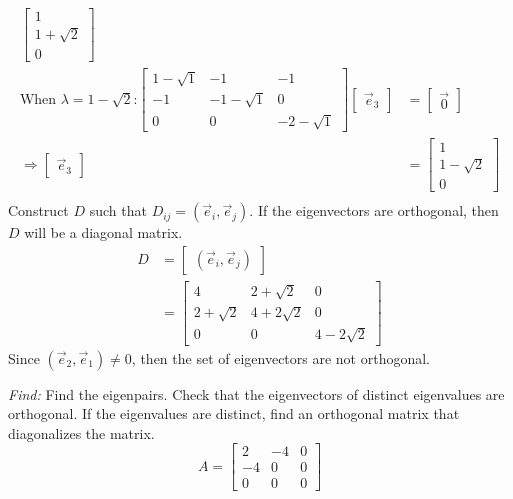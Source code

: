 \documentclass[11pt]{homework}
\begin{document}
\begin{align*}
\begin{bmatrix}
    1 \\
    1 + \sqrt{2} \\
    0
  \end{bmatrix}  \\
\text{When $\lambda = 1 - \sqrt{2}$:}
  \begin{bmatrix}
  1- \sqrt{1}  & -1 & -1 \\
  -1 & -1 - \sqrt{1} & 0 \\
  0 & 0 & -2 - \sqrt{1}
  \end{bmatrix}
  \begin{bmatrix}
    \vec e_3
  \end{bmatrix}
  &= 
  \begin{bmatrix}
    \vec 0
  \end{bmatrix} \\
  \Rightarrow
  \begin{bmatrix}
    \vec e_3
  \end{bmatrix}
  &= 
  \begin{bmatrix}
    1 \\
    1 - \sqrt{2} \\
    0
  \end{bmatrix}  \\
\end{align*}
Construct $D$ such that $D_{ij} = (\vec e_i, \vec e_j)$. 
If the eigenvectors are orthogonal, 
then $D$ will be a diagonal matrix.
\begin{align*}
D &= 
  \begin{bmatrix}
  (\vec e_i, \vec e_j)
  \end{bmatrix} \\
  &=
  \begin{bmatrix}
    4 & 2 +\sqrt{2} & 0 \\
    2+\sqrt{2} & 4 + 2\sqrt{2} & 0 \\
    0 & 0 & 4- 2\sqrt{2}
  \end{bmatrix}
\end{align*}
Since $( \vec e_2, \vec e_1) \neq 0$, 
then the set of eigenvectors are not orthogonal.

\question
\emph{Find:}
\newline
Find the eigenpairs.
Check that the eigenvectors of distinct eigenvalues are orthogonal.
If the eigenvalues are distinct, find an orthogonal matrix that diagonalizes the matrix.
\begin{equation*}
A = 
  \begin{bmatrix}
  2 & -4 & 0 \\
  -4 & 0 & 0 \\
  0 &  0 & 0
  \end{bmatrix}
\end{equation*}
\end{document}
